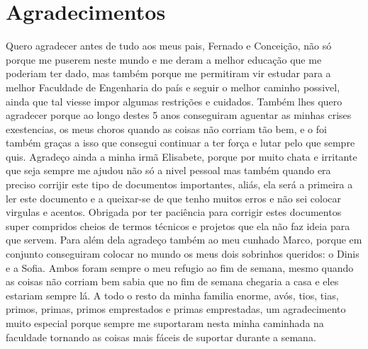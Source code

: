 \chapter*{Agradecimentos}
Quero agradecer antes de tudo aos meus pais, Fernado e Conceição, não só porque me puserem neste mundo e me deram a melhor educação que me poderiam ter dado, mas também porque me permitiram vir estudar para a melhor Faculdade de Engenharia do país e seguir o melhor caminho possivel, ainda que tal viesse impor algumas restrições e cuidados. Também lhes quero agradecer porque ao longo destes 5 anos conseguiram aguentar as minhas crises exestencias, os meus choros quando as coisas não corriam tão bem, e o foi também graças a isso que consegui continuar a ter força e lutar pelo que sempre quis. Agradeço ainda a minha irmã Elisabete, porque por muito chata e irritante que seja sempre me ajudou não só a nivel pessoal mas também quando era preciso corrijir este tipo de documentos importantes, aliás, ela será a primeira a ler este documento e a queixar-se de que tenho muitos erros e não sei colocar virgulas e acentos. Obrigada por ter paciência para corrigir estes documentos super compridos cheios de termos técnicos e projetos que ela não faz ideia para que servem. Para além dela agradeço também ao meu cunhado Marco, porque em conjunto conseguiram colocar no mundo os meus dois sobrinhos queridos: o Dinis e a Sofia. Ambos foram sempre o meu refugio ao fim de semana, mesmo quando as coisas não corriam bem sabia que no fim de semana chegaria a casa e eles estariam sempre lá. A todo o resto da minha familia enorme, avós, tios, tias, primos, primas, primos emprestados e primas emprestadas, um agradecimento muito especial porque sempre me suportaram nesta minha caminhada na faculdade tornando as coisas mais fáceis de suportar durante a semana.


\vspace{10mm}
